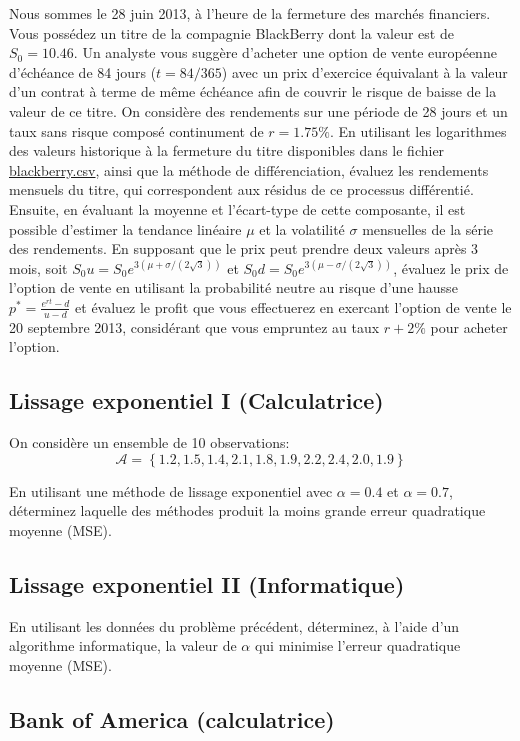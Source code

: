 \documentclass[11pt,english,francais]{article}
\begin{document}
Nous sommes le 28 juin 2013, à l'heure de la fermeture des marchés
financiers. Vous possédez un titre de la compagnie BlackBerry dont la
valeur est de $S_0 = 10.46$. Un analyste vous suggère d'acheter une
option de vente européenne d'échéance de 84 jours ($t=84/365$) avec un prix d'exercice
équivalant à la valeur d'un contrat à terme de même échéance afin de
couvrir le risque de baisse de la valeur de ce titre. On considère des
rendements sur une période de 28 jours et un taux sans risque composé
continument de $r=1.75\%$.  En utilisant les logarithmes des valeurs
historique à la fermeture du titre disponibles dans le fichier
\url{blackberry.csv}, ainsi que la méthode de différenciation,
évaluez les rendements mensuels du titre, qui correspondent aux
résidus de ce processus différentié. Ensuite, en évaluant la moyenne
et l'écart-type de cette composante, il est possible d'estimer la
tendance linéaire $\mu$ et la volatilité $\sigma$ mensuelles de la
série des rendements. En supposant que le prix peut prendre deux
valeurs après 3 mois, soit $S_0u = S_0 e^{3(\mu+\sigma/(2\sqrt{3}))}$
et $S_0d = S_0 e^{3(\mu-\sigma/(2\sqrt{3}))}$, évaluez le prix de
l'option de vente en utilisant la probabilité neutre au risque d'une
hausse $p^{*} = \frac{e^{rt}-d}{u-d}$ et évaluez le profit que vous
effectuerez en exercant l'option de vente le 20 septembre 2013,
considérant que vous empruntez au taux $r+2\%$ pour acheter l'option.

\subsection{Lissage exponentiel I (Calculatrice)}

On considère un ensemble de 10 observations:
\[
\mathcal{A}=\left\{1.2,1.5,1.4,2.1,1.8,1.9,2.2,2.4,2.0,1.9 \right\}
\]

En utilisant une méthode de lissage exponentiel avec $\alpha=0.4$ et
$\alpha=0.7$, déterminez laquelle des méthodes produit la moins grande
erreur quadratique moyenne (MSE).

\subsection{Lissage exponentiel II (Informatique)}

En utilisant les données du problème précédent, déterminez, à l'aide
d'un algorithme informatique, la valeur de $\alpha$ qui minimise
l'erreur quadratique moyenne (MSE).

\subsection{Bank of America (calculatrice)}
\end{document}

